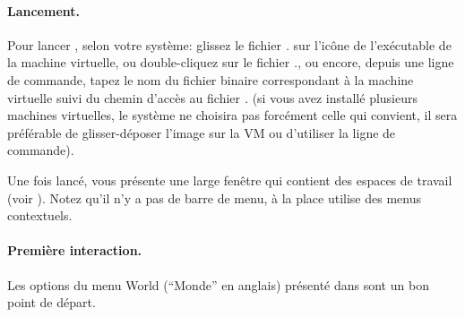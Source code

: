 \documentclass[a4paper,10pt,twoside]{book}
\begin{document}

\paragraph{Lancement.} Pour lancer \sq, selon votre système: glissez
le fichier \emph{.} sur l'icône de l'exécutable de la
machine virtuelle, ou double-cliquez sur le fichier
\emph{.}, ou encore, depuis une ligne de commande,
tapez le nom du fichier binaire correspondant \`a la machine virtuelle
suivi du chemin d'accès au fichier \emph{.} (si vous
avez installé plusieurs machines virtuelles, le système ne choisira
pas forcément celle qui convient, il sera préférable de
glisser-déposer l'image sur la VM ou d'utiliser la ligne de commande).

Une fois lancé, \sq vous présente une large fenêtre qui contient des espaces de travail (voir ). Notez qu'il n'y a pas de barre de menu, à la place \sq utilise des menus contextuels. 


\paragraph{Première interaction.}

Les options du menu World (``Monde'' en anglais) pr\'esent\'e dans
 sont un bon point de d\'epart.

\end{document}
